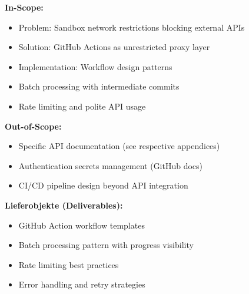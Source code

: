 \begin{tcolorbox}[colback=yellow!5, colframe=yellow!50, title=Appendix Scope: What This Appendix Covers]
\small
\textbf{In-Scope:}
\begin{itemize}[noitemsep]
    \item Problem: Sandbox network restrictions blocking external APIs
    \item Solution: GitHub Actions as unrestricted proxy layer
    \item Implementation: Workflow design patterns
    \item Batch processing with intermediate commits
    \item Rate limiting and polite API usage
\end{itemize}

\textbf{Out-of-Scope:}
\begin{itemize}[noitemsep]
    \item Specific API documentation (see respective appendices)
    \item Authentication secrets management (GitHub docs)
    \item CI/CD pipeline design beyond API integration
\end{itemize}

\textbf{Lieferobjekte (Deliverables):}
\begin{itemize}[noitemsep]
    \item GitHub Action workflow templates
    \item Batch processing pattern with progress visibility
    \item Rate limiting best practices
    \item Error handling and retry strategies
\end{itemize}
\end{tcolorbox}

\begin{abstract}
This appendix documents the methodology for integrating external APIs into the EBF framework when direct API access is blocked by sandbox network restrictions. We present a solution architecture using GitHub Actions as an unrestricted proxy layer, enabling systematic data enrichment (DOI lookups, parameter validation, citation analysis) through automated workflows. The batch processing pattern with intermediate commits ensures progress visibility and fault tolerance. We demonstrate the approach with CrossRef DOI lookups, achieving 350+ paper enrichment per workflow run with configurable batch sizes and automatic commits after each batch.
\end{abstract}

